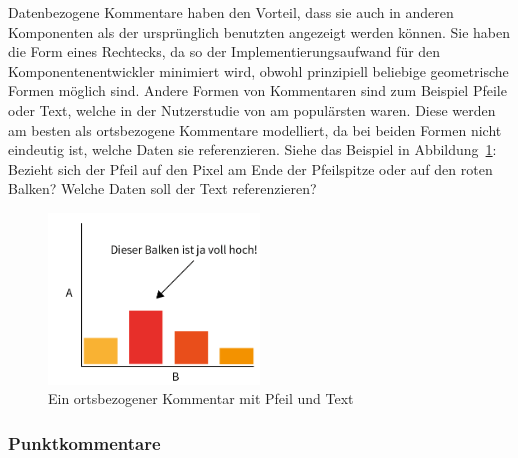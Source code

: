 \documentclass[
	headsepline,
	footsepline,
	fontsize=12pt,
	bibliography=totoc
]{scrbook}
\begin{document}
Datenbezogene Kommentare haben den Vorteil, dass sie auch in anderen Komponenten als der ursprünglich benutzten angezeigt werden können. Sie haben die Form eines Rechtecks, da so der Implementierungsaufwand für den Komponentenentwickler minimiert wird, obwohl prinzipiell beliebige geometrische Formen möglich sind. Andere Formen von Kommentaren sind zum Beispiel Pfeile oder Text, welche in der Nutzerstudie von \cite{Heer2007} am populärsten waren. Diese werden am besten als ortsbezogene Kommentare modelliert, da bei beiden Formen nicht eindeutig ist, welche Daten sie referenzieren. Siehe das Beispiel in Abbildung~\ref{figure:ortsbezogen}: Bezieht sich der Pfeil auf den Pixel am Ende der Pfeilspitze oder auf den roten Balken? Welche Daten soll der Text referenzieren?

\begin{figure}[htbp]
   \centering
   \includegraphics[width=0.5\textwidth]{images/konzeption-ortsbezogen.png}
   \caption{Ein ortsbezogener Kommentar mit Pfeil und Text}
   \label{figure:ortsbezogen}
\end{figure}

\subsubsection{Punktkommentare}

\end{document}
